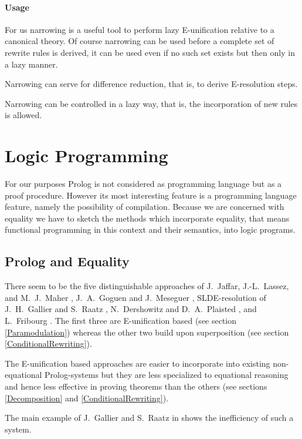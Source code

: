 \paragraph{Usage}
For us narrowing is a useful tool to perform lazy E-unification
relative to a canonical theory. Of course narrowing can be used before a
complete set of rewrite rules is derived, it can be used even if no 
such set exists but then only in a lazy manner.

Narrowing can serve for difference reduction, that is, to derive E-re\-so\-lu\-tion
steps.

Narrowing can be controlled in a lazy way, that is, the incorporation of 
new rules is allowed.

\section{Logic Programming}
\label{LogicProgramming}

For our purposes Prolog is not considered as programming language but as
a proof procedure. However its most interesting feature is a programming
language feature, namely the possibility of compilation.
Because we are concerned with 
equality we have to sketch the methods which incorporate equality, that means 
functional programming in this context and their semantics, into logic programs.

\subsection{Prolog and Equality}

There seem to be the five distinguishable approaches of J.\ Jaffar, J.-L.\ 
Lassez, and M.\ J.\ Maher \cite{JaLaMa84}, J.\ A.\ Goguen and J.\ Meseguer
\cite{GoMe85}, SLDE-resolution of J.\ H.\ Gallier and S.\ Raatz \cite{GaRa89},
N.\ Dershowitz and D.\ A.\ Plaisted \cite{DePl85},
and L.\ Fribourg \cite{Fribourg84a,Fribourg85a}. The first three are E-unification 
based (see section \ref{Paramodulation}) whereas the other two build
upon superposition (see section \ref{ConditionalRewriting}).

The E-unification based approaches are easier to incorporate into existing
non-equational Prolog-systems but they are less specialized to equational
reasoning and hence less effective in proving theorems than the others 
(see sections \ref{Decomposition} and 
\ref{ConditionalRewriting}).

The main example of J.\ Gallier and S.\ Raatz in \cite{GaRa89} shows the 
inefficiency of such a system.

